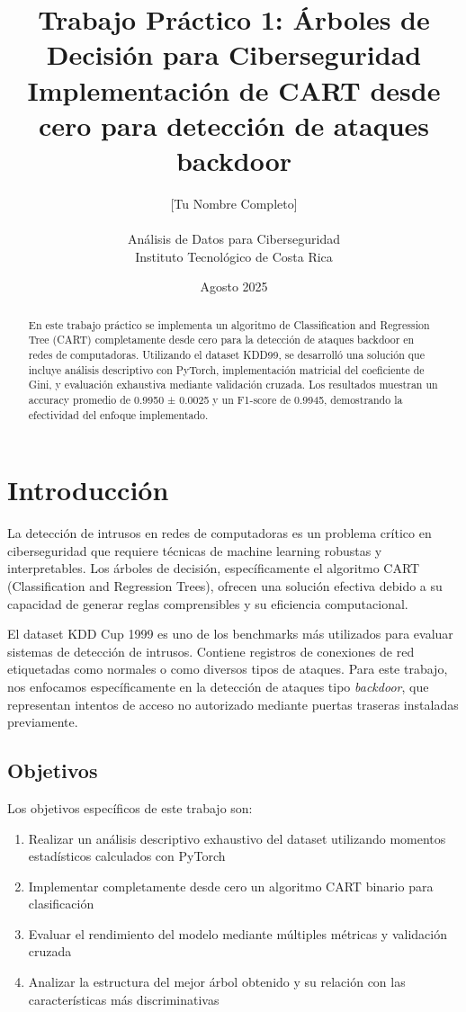 \documentclass[12pt,a4paper]{article}
\title{\textbf{Trabajo Práctico 1: Árboles de Decisión para Ciberseguridad}\\
        \large{Implementación de CART desde cero para detección de ataques backdoor}}
\author{[Tu Nombre Completo] \\
         [Tu Carné] \\
         Análisis de Datos para Ciberseguridad \\
         Instituto Tecnológico de Costa Rica}
\date{Agosto 2025}
\begin{document}
\maketitle

\begin{abstract}
En este trabajo práctico se implementa un algoritmo de Classification and Regression Tree (CART) completamente desde cero para la detección de ataques backdoor en redes de computadoras. Utilizando el dataset KDD99, se desarrolló una solución que incluye análisis descriptivo con PyTorch, implementación matricial del coeficiente de Gini, y evaluación exhaustiva mediante validación cruzada. Los resultados muestran un accuracy promedio de 0.9950 ± 0.0025 y un F1-score de 0.9945, demostrando la efectividad del enfoque implementado.
\end{abstract}

\section{Introducción}

La detección de intrusos en redes de computadoras es un problema crítico en ciberseguridad que requiere técnicas de machine learning robustas y interpretables. Los árboles de decisión, específicamente el algoritmo CART (Classification and Regression Trees), ofrecen una solución efectiva debido a su capacidad de generar reglas comprensibles y su eficiencia computacional.

El dataset KDD Cup 1999 \cite{kdd99} es uno de los benchmarks más utilizados para evaluar sistemas de detección de intrusos. Contiene registros de conexiones de red etiquetadas como normales o como diversos tipos de ataques. Para este trabajo, nos enfocamos específicamente en la detección de ataques tipo \textit{backdoor}, que representan intentos de acceso no autorizado mediante puertas traseras instaladas previamente.

\subsection{Objetivos}

Los objetivos específicos de este trabajo son:

\begin{enumerate}
    \item Realizar un análisis descriptivo exhaustivo del dataset utilizando momentos estadísticos calculados con PyTorch
    \item Implementar completamente desde cero un algoritmo CART binario para clasificación
    \item Evaluar el rendimiento del modelo mediante múltiples métricas y validación cruzada
    \item Analizar la estructura del mejor árbol obtenido y su relación con las características más discriminativas
\end{enumerate}
\end{document}
